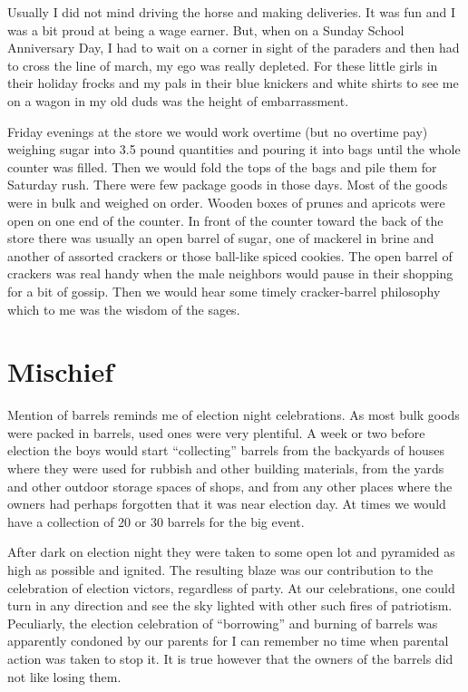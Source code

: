 \documentclass[12pt]{book}              %
\begin{document}
Usually I did not mind driving the horse and making deliveries. It was fun and I was a bit proud at being a wage earner. But, when on a Sunday School Anniversary Day, I had to wait on a corner in sight of the paraders and then had to cross the line of march, my ego was really depleted. For these little girls in their holiday frocks and my pals in their blue knickers and white shirts to see me on a wagon in my old duds was the height of embarrassment. 

Friday evenings at the store we would work overtime (but no overtime pay) weighing sugar into 3.5 pound quantities and pouring it into bags until the whole counter was filled. Then we would fold the tops of the bags and pile them for Saturday rush. There were few package goods in those days. Most of the goods were in bulk and weighed on order. Wooden boxes of prunes and apricots were open on one end of the counter. In front of the counter toward the back of the store there was usually an open barrel of sugar, one of mackerel in brine and another of assorted crackers or those ball-like spiced cookies. The open barrel of crackers was real handy when the male neighbors would pause in their shopping for a bit of gossip. Then we would hear some timely cracker-barrel philosophy which to me was the wisdom of the sages. 

\section*{Mischief}

Mention of barrels reminds me of election night celebrations. As most bulk goods were packed in barrels, used ones were very plentiful. A week or two before election the boys would start ``collecting'' barrels from the backyards of houses where they were used for rubbish and other building materials, from the yards and other outdoor storage spaces of shops, and from any other places where the owners had perhaps forgotten that it was near election day. At times we would have a collection of 20 or 30 barrels for the big event.

After dark on election night they were taken to some open lot and pyramided as high as possible and ignited. The resulting blaze was our contribution to the celebration of election victors, regardless of party. At our celebrations, one could turn in any direction and see the sky lighted with other such fires of patriotism. Peculiarly, the election celebration of ``borrowing'' and burning of barrels was apparently condoned by our parents for I can remember no time when parental action was taken to stop it. It is true however that the owners of the barrels did not like losing them.
\end{document}
